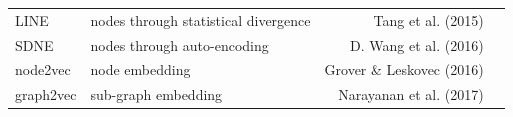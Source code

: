 \documentclass[10pt,oneside]{article}
\begin{document}
\begin{longtable}[]{@{}llrr@{}}
\begin{minipage}[t]{0.11\columnwidth}
LINE\strut
\end{minipage} & \begin{minipage}[t]{0.32\columnwidth}\raggedright
nodes through statistical divergence\strut
\end{minipage} & \begin{minipage}[t]{0.18\columnwidth}\raggedleft
Tang et al. (2015)\strut
\end{minipage} & \begin{minipage}[t]{0.28\columnwidth}\raggedleft
\strut
\end{minipage}\tabularnewline
\begin{minipage}[t]{0.11\columnwidth}\raggedright
SDNE\strut
\end{minipage} & \begin{minipage}[t]{0.32\columnwidth}\raggedright
nodes through auto-encoding\strut
\end{minipage} & \begin{minipage}[t]{0.18\columnwidth}\raggedleft
D. Wang et al. (2016)\strut
\end{minipage} & \begin{minipage}[t]{0.28\columnwidth}\raggedleft
\strut
\end{minipage}\tabularnewline
\begin{minipage}[t]{0.11\columnwidth}\raggedright
node2vec\strut
\end{minipage} & \begin{minipage}[t]{0.32\columnwidth}\raggedright
node embedding\strut
\end{minipage} & \begin{minipage}[t]{0.18\columnwidth}\raggedleft
Grover \& Leskovec (2016)\strut
\end{minipage} & \begin{minipage}[t]{0.28\columnwidth}\raggedleft
\strut
\end{minipage}\tabularnewline
\begin{minipage}[t]{0.11\columnwidth}\raggedright
graph2vec\strut
\end{minipage} & \begin{minipage}[t]{0.32\columnwidth}\raggedright
sub-graph embedding\strut
\end{minipage} & \begin{minipage}[t]{0.18\columnwidth}\raggedleft
Narayanan et al. (2017)\strut
\end{minipage} & \begin{minipage}[t]{0.28\columnwidth}\raggedleft
\strut
\end{minipage}\tabularnewline

\end{longtable}
\end{document}
